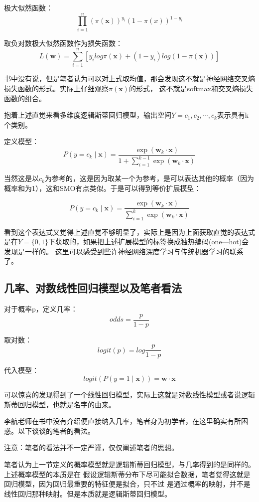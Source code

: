 \documentclass{article}
\begin{document}
        极大似然函数：
        \[\prod_{i=1}^{n}(\pi(\boldsymbol{x}))^{y_i}(1-\pi(x))^{1-y_i} \]
        
        取负对数极大似然函数作为损失函数：
        \[L(\boldsymbol{w})=\sum_{i=1}^{n}\left[y_ilog\pi(\boldsymbol{x})+(1-y_i)log(1-\pi(\boldsymbol{x}))\right]\]

        书中没有说，但是笔者认为可以对上式取均值，那会发现这不就是神经网络交叉熵损失函数的形式。实际上仔细观察$\pi(\boldsymbol{x})$的形式，
        这不就是softmax和交叉熵损失函数的组合。

        抱着上述直觉来看多维度逻辑斯蒂回归模型，输出空间$Y={c_1,c_2,\cdots,c_k}$表示具有k个类别。

        定义模型：
        \[P(y=c_k\mid\boldsymbol{x})=\frac{\exp(\boldsymbol{w}_k\cdot\boldsymbol{x})}{1+\sum_{i=1}^{k-1}\exp(\boldsymbol{w}_k\cdot\boldsymbol{x})}\]

        当然这是以$c_k$为参考的，这是因为取某一个为参考，是可以表达其他的概率（因为概率和为1），这和SMO有点类似。于是可以得到等价扩展模型：

        \[P(y=c_k\mid\boldsymbol{x})=\frac{\exp(\boldsymbol{w}_k\cdot\boldsymbol{x})}{\sum_{i=1}^{k}\exp(\boldsymbol{w}_k\cdot\boldsymbol{x})}\]

        看到这个表达式又觉得上述直觉不够明显了，实际上是因为上面获取直觉的表达式是在$Y=\{0,1\}$下获取的，如果把上述扩展模型的标签换成独热编码(one—hot)会发现是一样的。
        这里可以感受到些许神经网络深度学习与传统机器学习的联系了。
        \subsection{几率、对数线性回归模型以及笔者看法}
        对于概率p，定义几率：
        \[odds=\frac{p}{1-p}\]

        取对数：
        \[logit(p)=log\frac{p}{1-p}\]

        代入模型：
        \[logit(P(y=1\mid\boldsymbol{x}))=\boldsymbol{w}\cdot\boldsymbol{x}\]

        可以惊喜的发现得到了一个线性回归模型，实际上这就是对数线性模型或者说逻辑斯蒂回归模型，也就是名字的由来。

        李航老师在书中没有介绍便直接纳入几率，笔者身为初学者，在这里确实有所困惑。以下谈谈的笔者的看法。

        注意：笔者的看法并不一定严谨，仅仅阐述笔者的思想。

        笔者认为上一节定义的概率模型就是逻辑斯蒂回归模型，与几率得到的是同样的。上述概率模型的本质是在
        假设逻辑斯蒂分布下尽可能拟合数据，笔者觉得这就是回归模型，因为回归最重要的特征便是拟合，只不过
        是通过概率的映射，并不是线性回归那种映射。但是本质就是逻辑斯蒂回归模型。
\end{document}
